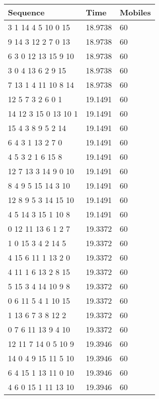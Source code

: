 	\begin{table}[H]
		\centering
		\begin{tabular}{|l|l|l|}
		\hline
		Sequence             & Time    & Mobiles \\ \hline
		3 1 14 4 5 10 0 15   & 18.9738 & 60      \\ \hline
		9 14 3 12 2 7 0 13   & 18.9738 & 60      \\ \hline
		6 3 0 12 13 15 9 10  & 18.9738 & 60      \\ \hline
		3 0 4 13 6 2 9 15    & 18.9738 & 60      \\ \hline
		7 13 1 4 11 10 8 14  & 18.9738 & 60      \\ \hline
		12 5 7 3 2 6 0 1     & 19.1491 & 60      \\ \hline
		14 12 3 15 0 13 10 1 & 19.1491 & 60      \\ \hline
		15 4 3 8 9 5 2 14    & 19.1491 & 60      \\ \hline
		6 4 3 1 13 2 7 0     & 19.1491 & 60      \\ \hline
		4 5 3 2 1 6 15 8     & 19.1491 & 60      \\ \hline
		12 7 13 3 14 9 0 10  & 19.1491 & 60      \\ \hline
		8 4 9 5 15 14 3 10   & 19.1491 & 60      \\ \hline
		12 8 9 5 3 14 15 10  & 19.1491 & 60      \\ \hline
		4 5 14 3 15 1 10 8   & 19.1491 & 60      \\ \hline
		0 12 11 13 6 1 2 7   & 19.3372 & 60      \\ \hline
		1 0 15 3 4 2 14 5    & 19.3372 & 60      \\ \hline
		4 15 6 11 1 13 2 0   & 19.3372 & 60      \\ \hline
		4 11 1 6 13 2 8 15   & 19.3372 & 60      \\ \hline
		5 15 3 4 14 10 9 8   & 19.3372 & 60      \\ \hline
		0 6 11 5 4 1 10 15   & 19.3372 & 60      \\ \hline
		1 13 6 7 3 8 12 2    & 19.3372 & 60      \\ \hline
		0 7 6 11 13 9 4 10   & 19.3372 & 60      \\ \hline
		12 11 7 14 0 5 10 9  & 19.3946 & 60      \\ \hline
		14 0 4 9 15 11 5 10  & 19.3946 & 60      \\ \hline
		6 4 15 1 13 11 0 10  & 19.3946 & 60      \\ \hline
		4 6 0 15 1 11 13 10  & 19.3946 & 60      \\ \hline

\end{tabular}
\end{table}

